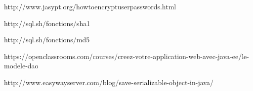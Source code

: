 http://www.jasypt.org/howtoencryptuserpasswords.html

http://sql.sh/fonctions/sha1

http://sql.sh/fonctions/md5

https://openclassrooms.com/courses/creez-votre-application-web-avec-java-ee/le-modele-dao

http://www.easywayserver.com/blog/save-serializable-object-in-java/